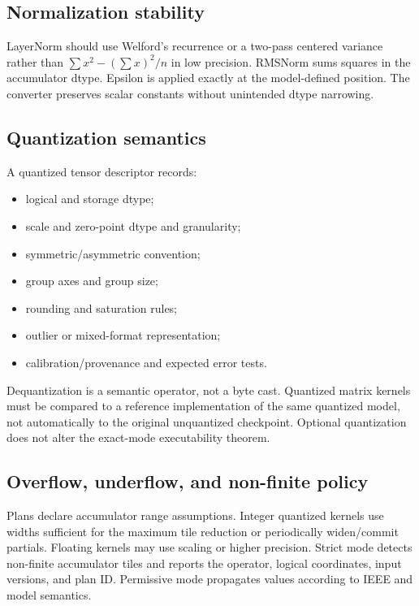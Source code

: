 \subsection{Normalization stability}

LayerNorm should use Welford's recurrence or a two-pass centered variance rather than $\sum x^2-(\sum x)^2/n$ in low precision. RMSNorm sums squares in the accumulator dtype. Epsilon is applied exactly at the model-defined position. The converter preserves scalar constants without unintended dtype narrowing.

\subsection{Quantization semantics}

A quantized tensor descriptor records:

\begin{itemize}
  \item logical and storage dtype;
  \item scale and zero-point dtype and granularity;
  \item symmetric/asymmetric convention;
  \item group axes and group size;
  \item rounding and saturation rules;
  \item outlier or mixed-format representation;
  \item calibration/provenance and expected error tests.
\end{itemize}

Dequantization is a semantic operator, not a byte cast. Quantized matrix kernels must be compared to a reference implementation of the same quantized model, not automatically to the original unquantized checkpoint. Optional quantization does not alter the exact-mode executability theorem.

\subsection{Overflow, underflow, and non-finite policy}

Plans declare accumulator range assumptions. Integer quantized kernels use widths sufficient for the maximum tile reduction or periodically widen/commit partials. Floating kernels may use scaling or higher precision. Strict mode detects non-finite accumulator tiles and reports the operator, logical coordinates, input versions, and plan ID. Permissive mode propagates values according to IEEE and model semantics.

